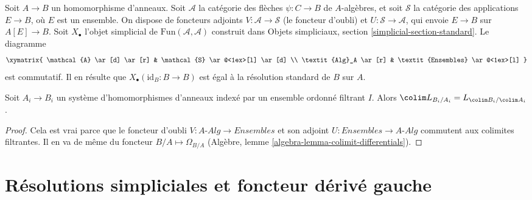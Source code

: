 \begin{remark}
\label{remark-variant-cotangent-complex}
Soit $A \to B$ un homomorphisme d'anneaux. Soit $\mathcal{A}$ la catégorie
des flèches $\psi : C \to B$ de $A$-algèbres, et soit $\mathcal{S}$ la
catégorie des applications $E \to B$, où $E$ est un ensemble. On dispose de
foncteurs adjoints $V : \mathcal{A} \to \mathcal{S}$ (le foncteur d'oubli) et
$U : \mathcal{S} \to \mathcal{A}$, qui envoie $E \to B$ sur
$A[E] \to B$. Soit $X_\bullet$ l'objet simplicial de
$\text{Fun}(\mathcal{A}, \mathcal{A})$ construit dans Objets simpliciaux,
section \ref{simplicial-section-standard}. Le diagramme
$$
\xymatrix{
\mathcal{A} \ar[d] \ar[r] & \mathcal{S} \ar@<1ex>[l] \ar[d] \\
\textit{Alg}_A \ar[r] & \textit{Ensembles} \ar@<1ex>[l]
}
$$
est commutatif. Il en résulte que $X_\bullet(\text{id}_B : B \to B)$ est égal
à la résolution standard de $B$ sur $A$.
\end{remark}

\begin{lemma}
\label{lemma-colimit-cotangent-complex}
Soit $A_i \to B_i$ un système d'homomorphismes d'anneaux indexé par un
ensemble ordonné filtrant $I$. Alors
$\colim L_{B_i/A_i} = L_{\colim B_i/\colim A_i}$.
\end{lemma}

\begin{proof}
Cela est vrai parce que le foncteur d'oubli
$V : A\textit{-Alg} \to \textit{Ensembles}$ et son adjoint
$U : \textit{Ensembles} \to A\textit{-Alg}$ commutent aux colimites filtrantes.
Il en va de même du foncteur $B/A \mapsto \Omega_{B/A}$
(Algèbre, lemme \ref{algebra-lemma-colimit-differentials}).
\end{proof}





\section{Résolutions simpliciales et foncteur dérivé gauche}
\label{section-compute-L-pi-shriek}

